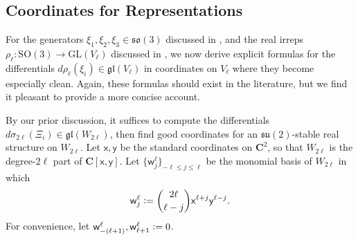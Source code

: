 \documentclass[a4paper,10pt,leqno]{article}
\numberwithin{equation}{section}
\theoremstyle{plain}
\theoremstyle{definition}
\theoremstyle{remark}
\newcommand{\bb}{\mathbf}
\newcommand{\fr}{\mathfrak}
\renewcommand{\sf}{\mathsf}
\newcommand{\GL}{\mathrm{GL}}
\newcommand{\SU}{\mathrm{SU}}
\newcommand{\SO}{\mathrm{SO}}
\begin{document}
\subsection{Coordinates for Representations}\label{subsec:rep-coords}

For the generators $\xi_1, \xi_2, \xi_3 \in \fr{so}(3)$ discussed in , and the real irreps $\rho_\ell \colon \SO(3) \to \GL(V_\ell)$ discussed in , we now derive explicit formulas for the differentials $d\rho_\ell(\xi_i) \in \fr{gl}(V_\ell)$ in coordinates on $V_\ell$ where they become especially clean.
Again, these formulas should exist in the literature, but we find it pleasant to provide a more concise account.

By our prior discussion, it suffices to compute
the differentials $d\sigma_{2\ell}(\Xi_i) \in \fr{gl}(W_{2\ell})$, then find good coordinates for an $\fr{su}(2)$-stable real structure on $W_{2\ell}$.
Let $\sf{x}, \sf{y}$ be the standard coordinates on $\bb{C}^2$, so that $W_{2\ell}$ is the degree-$2\ell$ part of $\bb{C}[\sf{x}, \sf{y}]$.
Let $\{\sf{w}_j^\ell\}_{-\ell \leq j \leq \ell}$
be the monomial basis of $W_{2\ell}$ in which 
\begin{align} 
\sf{w}_j^\ell \vcentcolon= \binom{2\ell}{\ell - j} \sf{x}^{\ell + j} \sf{y}^{\ell - j}.
\end{align} 
For convenience, let $\sf{w}_{-(\ell + 1)}^\ell, \sf{w}_{\ell + 1}^\ell \vcentcolon= 0$.
\end{document}
